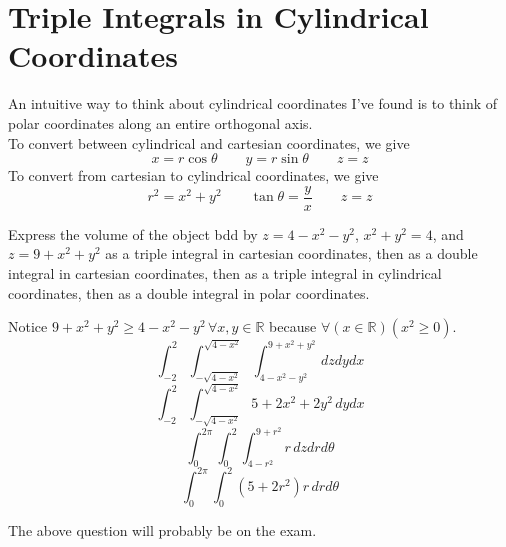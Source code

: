 \section{Triple Integrals in Cylindrical Coordinates}
An intuitive way to think about cylindrical coordinates I've found is to think of polar coordinates along an entire orthogonal axis.\\
To convert between cylindrical and cartesian coordinates, we give 
\[
    x=r\cos \theta \qquad y=r\sin \theta \qquad z=z
\]
To convert from cartesian to cylindrical coordinates, we give
\[
    r^2 =x^2 +y^2 \qquad \tan \theta =\frac{y}{x}\qquad z=z
\]
\begin{exercise}
    Express the volume of the object bdd by \(z=4-x^2 -y^2\), \(x^2 +y^2 =4\), and \(z=9+x^2 +y^2\) as a triple integral in cartesian coordinates, then as a double integral in cartesian coordinates, then as a triple integral in cylindrical coordinates, then as a double integral in polar coordinates.
\end{exercise}
\begin{solution}
    Notice \(9+x^2 +y^2 \geq 4-x^2 -y^2 \,\forall x,y\in\mathbb{R} \) because \(\forall (x\in\mathbb{R})\left( x^2 \geq 0 \right) \).
    \[
        \int_{-2}^2 \int_{-\sqrt{4-x^2} }^{\sqrt{4-x^2} }\int_{4-x^2 -y^2}^{9+x^2 +y^2}\,dzdydx
    \]
    \[
        \int_{-2}^2 \int_{-\sqrt{4-x^2} }^{\sqrt{4-x^2} } 5 +2x^2 +2y^2 \,dydx
    \]
    \[
        \int_{0}^{2\pi }\int_0^2 \int_{4-r^2}^{9+r^2}r\,dzdrd \theta
    \]
    \[
        \int_{0}^{2\pi }\int_0^2 \left( 5+2r^2 \right)r\,drd \theta 
    \]
\end{solution}
The above question will probably be on the exam.
